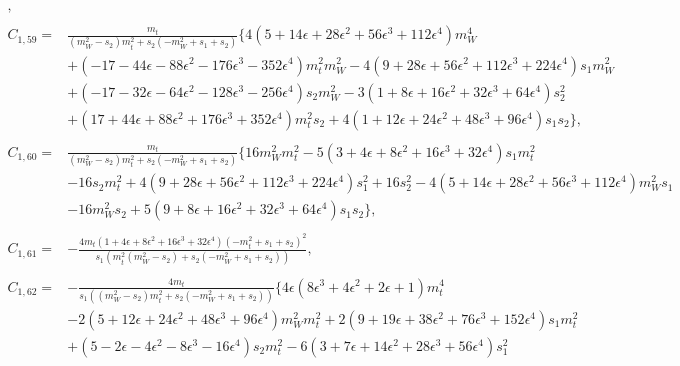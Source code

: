 \documentclass[twocolumn,aps,showpacs,nofootinbib,superscriptaddress,prd]{revtex4-2}
\begin{document}
\begin{widetext}
\begin{align}
,\nonumber\\
\nonumber\\
C_{1,59}=&\frac{m_t}{\left(m_W^2-s_2\right)m_t^2+s_2\left(-m_W^2+s_1+s_2\right)}\{4\left(5 +14 \epsilon +28 \epsilon^2 +56 \epsilon^3 +112 \epsilon^4\right)m_W^4
\nonumber\\&
+\left(-17 -44 \epsilon -88 \epsilon^2 -176 \epsilon^3 -352 \epsilon^4\right)m_t^2m_W^2-4\left(9 +28 \epsilon +56 \epsilon^2 +112 \epsilon^3 +224 \epsilon^4\right)s_1m_W^2
\nonumber\\&
+\left(-17 -32 \epsilon -64 \epsilon^2 -128 \epsilon^3 -256 \epsilon^4\right)s_2m_W^2-3\left(1 +8 \epsilon +16 \epsilon^2 +32 \epsilon^3 +64 \epsilon^4\right)s_2^2
\nonumber\\&
+\left(17 +44 \epsilon +88 \epsilon^2 +176 \epsilon^3 +352 \epsilon^4\right)m_t^2s_2+4\left(1 +12 \epsilon +24 \epsilon^2 +48 \epsilon^3 +96 \epsilon^4\right)s_1s_2\}
,\nonumber\\
\nonumber\\
C_{1,60}=&\frac{m_t}{\left(m_W^2-s_2\right)m_t^2+s_2\left(-m_W^2+s_1+s_2\right)}\{16m_W^2m_t^2-5\left(3 +4 \epsilon +8 \epsilon^2 +16 \epsilon^3 +32 \epsilon^4\right)s_1m_t^2
\nonumber\\&
-16s_2m_t^2+4\left(9 +28 \epsilon +56 \epsilon^2 +112 \epsilon^3 +224 \epsilon^4\right)s_1^2+16s_2^2-4\left(5 +14 \epsilon +28 \epsilon^2 +56 \epsilon^3 +112 \epsilon^4\right)m_W^2s_1
\nonumber\\&
-16m_W^2s_2+5\left(9 +8 \epsilon +16 \epsilon^2 +32 \epsilon^3 +64 \epsilon^4\right)s_1s_2\}
,\nonumber\\
\nonumber\\
C_{1,61}=&-\frac{4m_t\left(1 +4 \epsilon +8 \epsilon^2 +16 \epsilon^3 +32 \epsilon^4\right)\left(-m_t^2+s_1+s_2\right)^2}{s_1\left(m_t^2
\left(m_W^2-s_2\right)+s_2\left(-m_W^2+s_1+s_2\right)\right)}
,\nonumber\\
\nonumber\\
C_{1,62}=&-\frac{4m_t}{s_1\left(\left(m_W^2-s_2\right)m_t^2+s_2\left(-m_W^2+s_1+s_2\right)\right)}\{4\epsilon\left(8\epsilon^3+4\epsilon^2+2\epsilon+1\right)m_t^4
\nonumber\\&
-2\left(5 +12 \epsilon +24 \epsilon^2 +48 \epsilon^3 +96 \epsilon^4\right)m_W^2m_t^2+2\left(9 +19 \epsilon +38 \epsilon^2 +76 \epsilon^3 +152 \epsilon^4\right)s_1m_t^2
\nonumber\\&
+\left(5 -2 \epsilon -4 \epsilon^2 -8 \epsilon^3 -16 \epsilon^4\right)s_2m_t^2-6\left(3 +7 \epsilon +14 \epsilon^2 +28 \epsilon^3 +56 \epsilon^4\right)s_1^2
\nonumber\\&

\end{align}
\end{widetext}
\end{document}
